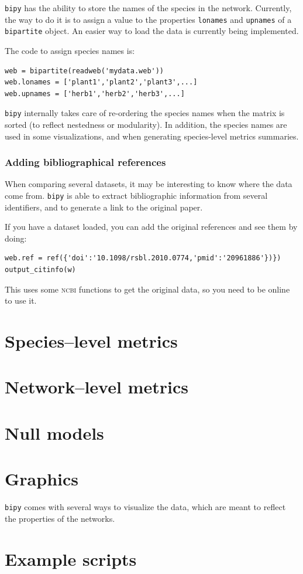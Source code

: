 \documentclass[nols,b5paper]{tufte-book}
\begin{document}
\texttt{bipy} has the ability to store the names of the species in the network. Currently, the way to do it is to assign a value to the properties \texttt{lonames} and \texttt{upnames} of a \texttt{bipartite} object. An easier way to load the data is currently being implemented.

The code to assign species names is:

\begin{lstlisting}[caption=attributing species names]
web = bipartite(readweb('mydata.web'))
web.lonames = ['plant1','plant2','plant3',...]
web.upnames = ['herb1','herb2','herb3',...]
\end{lstlisting}

\texttt{bipy} internally takes care of re-ordering the species names when the matrix is sorted (to reflect nestedness or modularity). In addition, the species names are used in some visualizations, and when generating species-level metrics summaries. 

\subsection{Adding bibliographical references}

When comparing several datasets, it may be interesting to know where the data come from. \texttt{bipy} is able to extract bibliographic information from several identifiers, and to generate a link to the original paper.

If you have a dataset loaded, you can add the original references and see them by doing:

\begin{lstlisting}[caption=attributing a reference]
web.ref = ref({'doi':'10.1098/rsbl.2010.0774,'pmid':'20961886'})})
output_citinfo(w)
\end{lstlisting}

This uses some \textsc{ncbi} functions to get the original data, so you need to be online to use it. 

\chapter{Species--level metrics}

\chapter{Network--level metrics}

\chapter{Null models}

\chapter{Graphics}

\texttt{bipy} comes with several ways to visualize the data, which are meant to reflect the properties of the networks.

\chapter{Example scripts\label{c:ex}}
\end{document}
